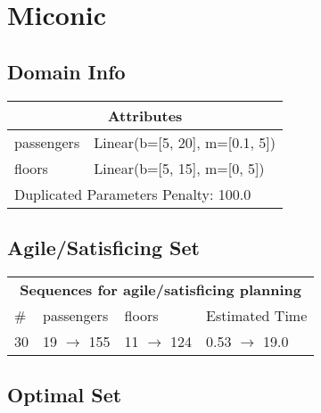 \documentclass{article}
\begin{document}
                            \newpage \section{Miconic}
                    \subsection*{Domain Info}

                    \begin{center}
                    \begin{tabular}{@{}p{}p{}@{}}
                    \multicolumn{2}{c}{\bf \large Attributes}\\\midrule
                    passengers & Linear(b=[5, 20], m=[0.1, 5])\\
floors & Linear(b=[5, 15], m=[0, 5])
                    
                     \\\midrule
                    \multicolumn{2}{l}{Duplicated Parameters Penalty: 100.0}
                    \end{tabular}
                    \end{center}
                
                         \subsection*{Agile/Satisficing Set}

                        \begin{center}
                        \begin{tabular}{@{}l|l|l|l@{}}
                        \multicolumn{4}{c}{\bf \large Sequences for agile/satisficing planning}\\
                        \# & passengers & floors & Estimated Time\\\midrule
                        30&19 $\rightarrow$ 155&11 $\rightarrow$ 124&0.53 $\rightarrow$ 19.0
                        \end{tabular}
                        \end{center}
                    
                            \subsection*{Optimal Set}
\end{document}
